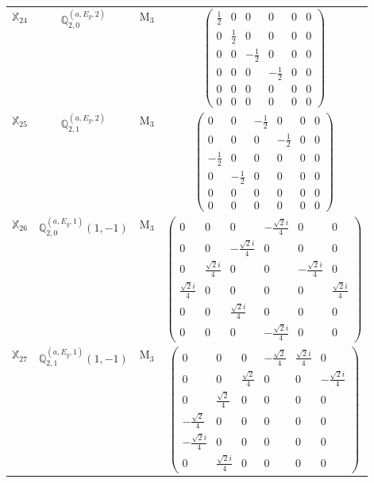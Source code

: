 \documentclass[fleqn,10pt,landscape]{article}
\begin{document}
\begin{itemize}
\begin{center}
\begin{longtable}{c|c|c|c}
$ \mathbb{X}_{24} $ & $\mathbb{Q}_{2,0}^{(a,E_{g},2)}$ & M$_{3}$ & $\begin{pmatrix} \frac{1}{2} & 0 & 0 & 0 & 0 & 0 \\ 0 & \frac{1}{2} & 0 & 0 & 0 & 0 \\ 0 & 0 & - \frac{1}{2} & 0 & 0 & 0 \\ 0 & 0 & 0 & - \frac{1}{2} & 0 & 0 \\ 0 & 0 & 0 & 0 & 0 & 0 \\ 0 & 0 & 0 & 0 & 0 & 0 \end{pmatrix}$ \\
$ \mathbb{X}_{25} $ & $\mathbb{Q}_{2,1}^{(a,E_{g},2)}$ & M$_{3}$ & $\begin{pmatrix} 0 & 0 & - \frac{1}{2} & 0 & 0 & 0 \\ 0 & 0 & 0 & - \frac{1}{2} & 0 & 0 \\ - \frac{1}{2} & 0 & 0 & 0 & 0 & 0 \\ 0 & - \frac{1}{2} & 0 & 0 & 0 & 0 \\ 0 & 0 & 0 & 0 & 0 & 0 \\ 0 & 0 & 0 & 0 & 0 & 0 \end{pmatrix}$ \\
$ \mathbb{X}_{26} $ & $\mathbb{Q}_{2,0}^{(a,E_{g},1)}(1,-1)$ & M$_{3}$ & $\begin{pmatrix} 0 & 0 & 0 & - \frac{\sqrt{2} i}{4} & 0 & 0 \\ 0 & 0 & - \frac{\sqrt{2} i}{4} & 0 & 0 & 0 \\ 0 & \frac{\sqrt{2} i}{4} & 0 & 0 & - \frac{\sqrt{2} i}{4} & 0 \\ \frac{\sqrt{2} i}{4} & 0 & 0 & 0 & 0 & \frac{\sqrt{2} i}{4} \\ 0 & 0 & \frac{\sqrt{2} i}{4} & 0 & 0 & 0 \\ 0 & 0 & 0 & - \frac{\sqrt{2} i}{4} & 0 & 0 \end{pmatrix}$ \\
$ \mathbb{X}_{27} $ & $\mathbb{Q}_{2,1}^{(a,E_{g},1)}(1,-1)$ & M$_{3}$ & $\begin{pmatrix} 0 & 0 & 0 & - \frac{\sqrt{2}}{4} & \frac{\sqrt{2} i}{4} & 0 \\ 0 & 0 & \frac{\sqrt{2}}{4} & 0 & 0 & - \frac{\sqrt{2} i}{4} \\ 0 & \frac{\sqrt{2}}{4} & 0 & 0 & 0 & 0 \\ - \frac{\sqrt{2}}{4} & 0 & 0 & 0 & 0 & 0 \\ - \frac{\sqrt{2} i}{4} & 0 & 0 & 0 & 0 & 0 \\ 0 & \frac{\sqrt{2} i}{4} & 0 & 0 & 0 & 0 \end{pmatrix}$ \\

\end{longtable}
\end{center}
\end{itemize}
\end{document}
